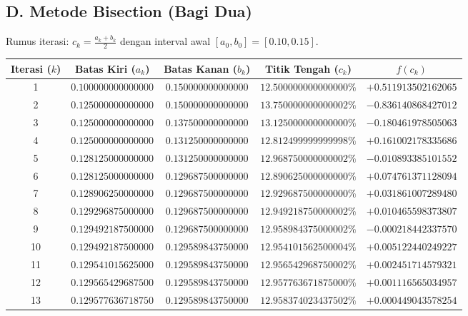 \documentclass[11pt,a4paper]{article}
\begin{document}
\subsection*{D. Metode Bisection (Bagi Dua)}
Rumus iterasi: $c_k = \frac{a_k + b_k}{2}$ dengan interval awal $[a_0, b_0] = [0.10, 0.15]$.

\begin{center}
\footnotesize
\setlength{\tabcolsep}{4pt}
\begin{tabular}{ccccc}
\toprule
\textbf{Iterasi ($k$)} & \textbf{Batas Kiri ($a_k$)} & \textbf{Batas Kanan ($b_k$)} & \textbf{Titik Tengah ($c_k$)} & \textbf{$f(c_k)$} \\
\midrule
1 & $0.100000000000000$ & $0.150000000000000$ & $12.500000000000000\%$ & $+0.511913502162065$ \\
2 & $0.125000000000000$ & $0.150000000000000$ & $13.750000000000002\%$ & $-0.836140868427012$ \\
3 & $0.125000000000000$ & $0.137500000000000$ & $13.125000000000000\%$ & $-0.180461978505063$ \\
4 & $0.125000000000000$ & $0.131250000000000$ & $12.812499999999998\%$ & $+0.161002178335686$ \\
5 & $0.128125000000000$ & $0.131250000000000$ & $12.968750000000002\%$ & $-0.010893385101552$ \\
6 & $0.128125000000000$ & $0.129687500000000$ & $12.890625000000000\%$ & $+0.074761371128094$ \\
7 & $0.128906250000000$ & $0.129687500000000$ & $12.929687500000000\%$ & $+0.031861007289480$ \\
8 & $0.129296875000000$ & $0.129687500000000$ & $12.949218750000002\%$ & $+0.010465598373807$ \\
9 & $0.129492187500000$ & $0.129687500000000$ & $12.958984375000002\%$ & $-0.000218442337570$ \\
10 & $0.129492187500000$ & $0.129589843750000$ & $12.954101562500004\%$ & $+0.005122440249227$ \\
11 & $0.129541015625000$ & $0.129589843750000$ & $12.956542968750002\%$ & $+0.002451714579321$ \\
12 & $0.129565429687500$ & $0.129589843750000$ & $12.957763671875000\%$ & $+0.001116565034957$ \\
13 & $0.129577636718750$ & $0.129589843750000$ & $\mathbf{12.958374023437502\%}$ & $+0.000449043578254$ \\
\bottomrule
\end{tabular}
\end{center}
\end{document}
